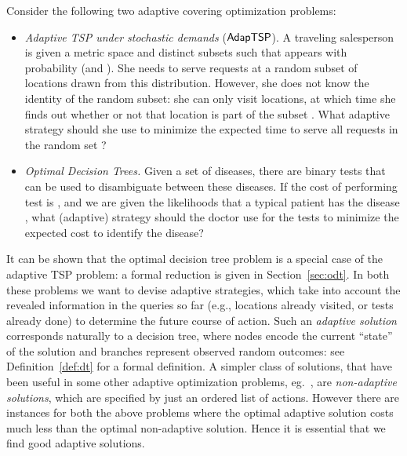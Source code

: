 \documentclass[11pt]{article}
\def\stsp{\ensuremath{{\sf AdapTSP}}\xspace}
\def\dtp{optimal decision tree problem\xspace}
\begin{document}
Consider the following two adaptive covering optimization problems:
\begin{itemize}

\item \emph{Adaptive TSP under stochastic demands} (\stsp). A traveling  salesperson is given a metric space  and distinct subsets  such that  appears with probability   (and ). She needs to serve requests at a random
subset  of locations drawn from this distribution. However, she does not know the identity of the
  random subset: she can only visit locations, at which time she finds
  out whether or not that location is part of the subset . What adaptive
  strategy should she use to minimize the expected time to serve all
  requests in the random  set ?

\item \emph{Optimal Decision Trees.} Given a set of  diseases, there
  are  binary tests that can be used to disambiguate between these
  diseases.  If the cost of performing test  is ,
  and we are given the likelihoods  that a typical
  patient has the disease , what (adaptive) strategy should the
  doctor use for the tests to minimize the expected cost to identify the
  disease?   
  \end{itemize}

It can be shown that the \dtp is a special case of the adaptive TSP problem: a formal reduction is given in
Section~\ref{sec:odt}.  In both these problems we want to devise adaptive strategies, which take into account
the revealed information in the queries so far (e.g., locations already visited, or tests already done) to determine
the future course of action. Such an {\em adaptive solution} corresponds naturally to a decision tree, where nodes encode the current ``state'' of the solution and branches represent observed random outcomes: see Definition~\ref{def:dt} for a formal definition.  A simpler class of solutions, that have been useful in some other adaptive optimization problems, eg.~\cite{DGV08,GuhaM09,BGLMNR12}, are {\em non-adaptive solutions}, which are specified by just an ordered list of actions. However there are instances for both the above problems where the optimal adaptive solution costs much less than the optimal non-adaptive solution.  
Hence it is
essential that we find good  adaptive solutions.
\end{document}
